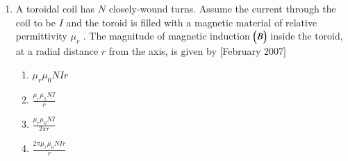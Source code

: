 \documentclass[journal]{IEEEtran}
\begin{document}
\begin{enumerate}
\begin{enumerate}
\item $  \frac{m}{2} \brak{ \frac{dq}{dt} + q }^2 $ \hfill[February 2007]
\item $  \frac{m}{2} \brak{ \frac{dq}{dt} - q }^2 $
\item $  \frac{m}{2} \brak{ \frac{dq}{dt} }^2 + q \frac{dq}{dt} - q^2 $
\item $  \frac{m}{2} \brak{ \frac{dq}{dt} }^2 - q \frac{dq}{dt} + q^2 $
\end{enumerate}
\item A toroidal coil has  $N$  closely-wound turns. Assume the current through the coil to be $I$ and the toroid is filled with a magnetic material of relative permittivity $ \mu_r$ . The magnitude of magnetic induction $\begin{pmatrix}B\end{pmatrix} $ inside the toroid, at a radial distance $r$  from the axis, is given by \hfill[February 2007]

\begin{enumerate}
\item $  \mu_r \mu_0 NIr $
\item $ \frac{\mu_r \mu_0 NI}{r} $
\item $  \frac{\mu_r \mu_0 NI}{2 \pi r} $
\item $ \frac{2 \pi \mu_r \mu_0 NIr}{r} $
\end{enumerate}




\end{enumerate}
\end{document}
